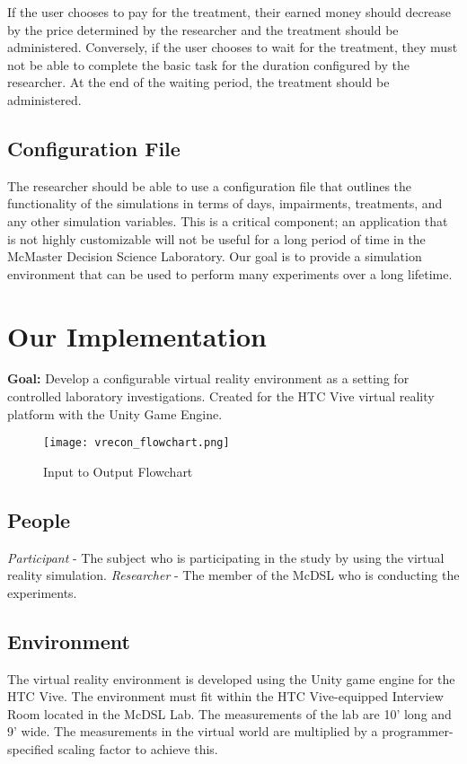 \documentclass{article}
\begin{document}
If the user chooses to pay for the treatment, their earned money should decrease by the price determined by the researcher and the treatment should be administered. Conversely, if the user chooses to wait for the treatment, they must not be able to complete the basic task for the duration configured by the researcher. At the end of the waiting period, the treatment should be administered.

\subsection{Configuration File}
The researcher should be able to use a configuration file that outlines the functionality of the simulations in terms of days, impairments, treatments, and any other simulation variables. This is a critical component; an application that is not highly customizable will not be useful for a long period of time in the McMaster Decision Science Laboratory. Our goal is to provide a simulation environment that can be used to perform many experiments over a long lifetime.

\section{Our Implementation}
\textbf{Goal:} Develop a configurable virtual reality environment as a setting for controlled laboratory investigations. Created for the HTC Vive virtual reality platform with the Unity Game Engine.

\begin{figure}[h!]
\centering
\texttt{[image: vrecon\_flowchart.png]}
\caption{Input to Output Flowchart}
\label{fig:flowchart}
\end{figure}

\subsection{People}
\emph{Participant} - The subject who is participating in the study by using the virtual reality simulation.\newline
\emph{Researcher} - The member of the McDSL who is conducting the experiments.

\subsection{Environment}

The virtual reality environment is developed using the Unity game engine for the HTC Vive. The environment must fit within the HTC Vive-equipped Interview Room located in the McDSL Lab. The measurements of the lab are 10’ long and 9’ wide. The measurements in the virtual world are multiplied by a programmer-specified scaling factor to achieve this.
\end{document}
